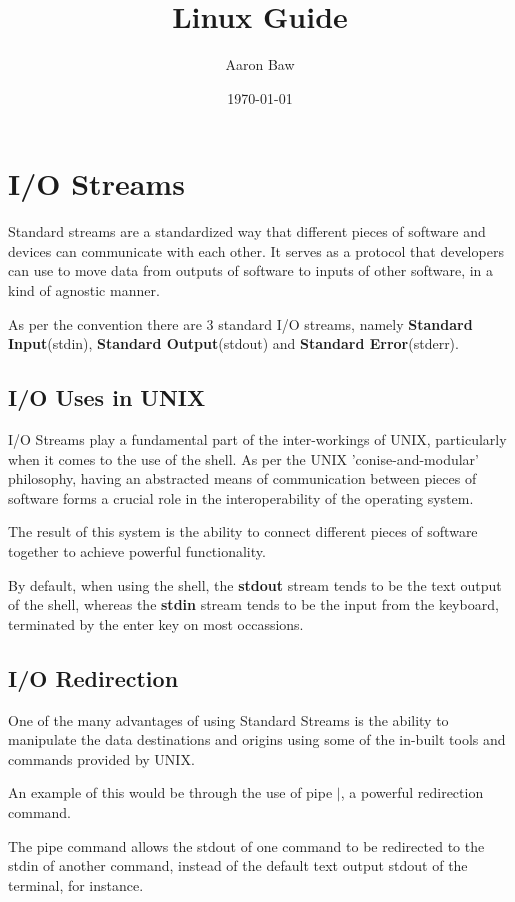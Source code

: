 \documentclass{article}
\title{Linux Guide}
\author{Aaron Baw}
\date{\today}
\begin{document}
\maketitle

\tableofcontents

\section{I/O Streams}
Standard streams are a standardized way that different pieces of software and devices can communicate with each other. It serves as a protocol
that developers can use to move data from outputs of software to inputs of other software, in a kind of agnostic manner.

As per the convention there are 3 standard I/O streams, namely \textbf{Standard Input}(stdin), \textbf{Standard Output}(stdout) and \textbf{Standard Error}(stderr).\cite{redirectingIO}

\subsection{I/O Uses in UNIX}
I/O Streams play a fundamental part of the inter-workings of UNIX, particularly when it comes to the use of the shell. As per the UNIX 'conise-and-modular'
philosophy, having an abstracted means of communication between pieces of software forms a crucial role in the interoperability of the operating system.

The result of this system is the ability to connect different pieces of software together to achieve powerful functionality.

By default, when using the shell, the \textbf{stdout} stream tends to be the text output of the shell, whereas the \textbf{stdin} stream tends
to be the input from the keyboard, terminated by the enter key on most occassions.

\subsection{I/O Redirection}
One of the many advantages of using Standard Streams is the ability to manipulate the data destinations and origins using some of the in-built tools and commands
provided by UNIX.

An example of this would be through the use of pipe \textbf{$\vert$}, a powerful redirection command.

The pipe command allows the stdout of one command to be redirected to the stdin of another command, instead of the default text output stdout of the terminal, for instance.
\end{document}

